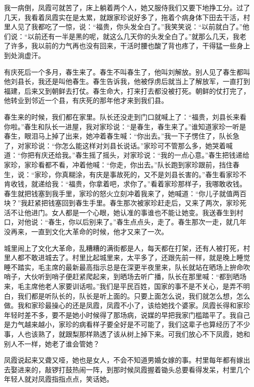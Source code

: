 \documentclass[12pt,UTF8]{ctexbook}
\begin{document}
我一病倒，凤霞可就苦了，床上躺着两个人，她又服侍我们又要下地挣工分。过了几天，我看着凤霞实在是太累，就跟家珍说好多了，拖着个病身体下田去干活，村里人见了我都吃了一惊，说：“福贵，你头发全白了。”我笑笑说：“以前就白了。”他们说：“以前还有一半是黑的呢，就这么几天你的头发全白了。”就那么几天，我老了许多，我以前的力气再也没有回来，干活时腰也酸了背也疼了，干得猛一些身上到处淌虚汗。

有庆死后一个多月，春生来了。春生不叫春生了，他叫刘解放。别人见了春生都叫他刘县长，我还是叫他春生。春生告诉我，他被俘虏后就当上了解放军，一直打到福建，后来又到朝鲜去打仗。春生命大，打来打去都没被打死。朝鲜的仗打完了，他转业到邻近一个县，有庆死的那年他才来到我们县。

春生来的时候，我们都在家里。队长还没走到门口就喊上了：“福贵，刘县长来看你啦。”春生和队长一进屋，我对家珍说：“是春生，春生来了。”谁知道家珍一听是春生，眼泪马上掉了出来，她冲着春生喊：“你出去。”我一下子愣住了，队长急了，对家珍说：“你怎么能这样对刘县长说话。”家珍可不管那么多，她哭着喊道：“你把有庆还给我。”春生摇了摇头，对家珍说：“我的一点心意。”春生把钱递给家珍，家珍看都不看，冲着他喊：“你走，你出去。”队长跑到家珍跟前，挡住春生，说：“家珍，你真糊涂，有庆是事故死的，又不是刘县长害的。”春生看家珍不肯收钱，就递给我：“福贵，你拿着吧，求你了。”看着家珍那样子，我哪敢收钱。春生就把钱塞到我手里，家珍的怒火立刻冲着我来了，她喊道：“你儿子就值两百块？”我赶紧把钱塞回到春生手里。春生那次被家珍赶走后，又来了两次，家珍死活不让他进门。女人都是一个心眼，她认准的事谁也不能让她变。我送春生到村口，对他说：“春生，你以后别来了。”春生点点头，走了。春生那次一走，就几年没再来，一直到文化大革命的时候，他才又来了一次。

城里闹上了文化大革命，乱糟糟的满街都是人，每天都在打架，还有人被打死，村里人都不敢进城去了。村里比起城里来，太平多了，还跟先前一样，就是晚上睡觉睡不踏实，毛主席的最新最高指示总是在深更半夜里来，队长就站在晒场上拚命吹哨子，大伙听到哨子便赶紧爬起来，到晒场去听广播，队长在那里喊：“都到晒场来，毛主席他老人家要训话啦。”我们是平民百姓，国家的事不是不关心，是弄不明白，我们都是听队长的，队长是听上面的。只要上面怎么说，我们就怎么想，怎么做。我和家珍最操心的还是凤霞，凤霞不小了，该给她找个婆家。凤霞长得和家珍年轻时差不多，要不是她小时候得了那场病，说媒的早把我家门槛踏平了。我自己是力气越来越小，家珍的病看样子要全好是不可能了，我们这辈子也算经历了不少事，人也该熟了，就跟梨那样熟透了该从树上掉下来。可我们放心不下凤霞，她和别人不一样，她老了谁会管她？

凤霞说起来又聋又哑，她也是女人，不会不知道男婚女嫁的事。村里每年都有嫁出去娶进来的，敲锣打鼓热闹一阵，到那时候凤霞握着锄头总要看得发呆，村里几个年轻人就对凤霞指指点点，笑话她。
\end{document}

